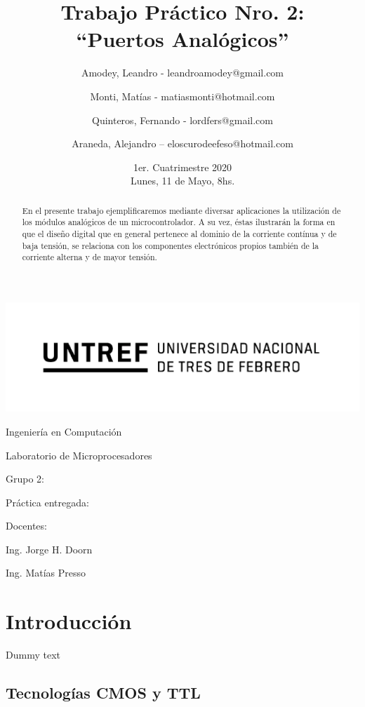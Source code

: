 \documentclass[a4paper]{article}
\title{Trabajo Práctico Nro. 2:\\“Puertos Analógicos”}
\author{Amodey, Leandro - leandroamodey@gmail.com
\and Monti, Matías - matiasmonti@hotmail.com
\and Quinteros, Fernando - lordfers@gmail.com
\and Araneda, Alejandro – eloscurodeefeso@hotmail.com}
\date{1er. Cuatrimestre 2020\\Lunes, 11 de Mayo, 8hs.}
\def\teacher{Ing. Jorge H. Doorn
\and Ing. Matías Presso}
\begin{document}

\begin{titlepage}\renewcommand\and\par\centering\makeatletter
    \includegraphics{logo.png}\par
    {\Large Ingeniería en Computación \par}\vspace{0.5cm}
    {\LARGE Laboratorio de Microprocesadores \par}\vfill
    {\huge \@title \par}\vfill
    Grupo 2:\par
    \@author\vfill
    Práctica entregada:\par
    \@date\vfill
    Docentes:\par
    \teacher\vspace{1cm}\makeatother
\end{titlepage}

\begin{abstract}

    En el presente trabajo ejemplificaremos mediante diversar 
    aplicaciones la utilización de los módulos analógicos de un 
    microcontrolador. A su vez, éstas ilustrarán la forma en que el 
    diseño digital que en general pertenece al dominio de la 
    corriente contínua y de baja tensión, se relaciona con los 
    componentes electrónicos propios también de la corriente alterna 
    y de mayor tensión.

\end{abstract}

\section{Introducción}
Dummy text

\subsection*{Tecnologías CMOS y TTL}
\end{document}
